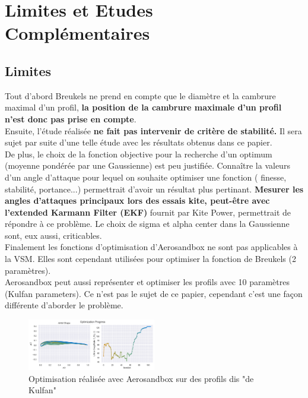 \section{ Limites et Etudes Complémentaires}
\label{sec:Ch4}

\subsection{Limites}
\label{sec:Ch4.1}

Tout d'abord Breukels ne prend en compte que le diamètre et la cambrure maximal d'un profil, \textbf{la position de la cambrure maximale d'un profil n'est donc pas prise en compte}. \\

Ensuite, l'étude réalisée \textbf{ne fait pas intervenir de critère de stabilité.} Il sera sujet par suite d'une telle étude avec les résultats obtenus dans ce papier.\\

De plus, le choix de la fonction objective pour la recherche d'un optimum (moyenne pondérée par une Gaussienne) est peu justifiée. Connaître la valeurs d'un angle d'attaque pour lequel on souhaite optimiser une fonction ( finesse, stabilité, portance...) permettrait d'avoir un résultat plus pertinant. \textbf{Mesurer les angles d'attaques principaux lors des essais kite, peut-être avec l'extended Karmann Filter (EKF)} fournit par Kite Power, permettrait de répondre à ce problème. Le choix de sigma et alpha center dans la Gaussienne sont, eux aussi, criticables.\\

Finalement les fonctions d'optimisation d'Aerosandbox ne sont pas applicables à la VSM. Elles sont cependant utilisées pour optimiser la fonction de Breukels (2 paramètres). \\
Aerosandbox peut aussi représenter et optimiser les profils avec 10 paramètres (Kulfan parameters). Ce n'est pas le sujet de ce papier, cependant c'est une façon différente d'aborder le problème. 

\begin{figure}[H]
    \centering
    \includegraphics[width=0.5\textwidth]{Pics/optim neuralfoil.png}  
    \caption{Optimisation réalisée avec Aerosandbox sur des profils dis "de Kulfan"}
    \label{fig:kulfan}
\end{figure}

